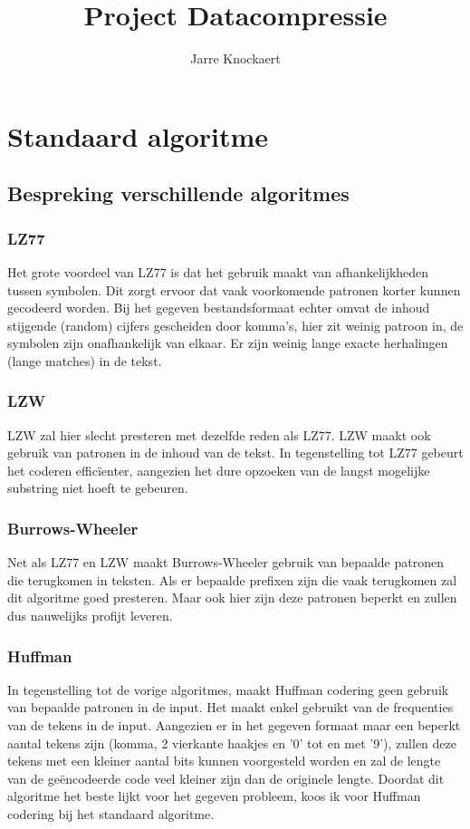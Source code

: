 \documentclass[11pt, a4paper]{article}
\begin{document}
	\title{Project Datacompressie}
	\author{Jarre Knockaert}
	\maketitle
\thispagestyle{empty}
\newpage
{}
\section{Standaard algoritme}
\subsection{Bespreking verschillende algoritmes}
\subsubsection{LZ77}
Het grote voordeel van LZ77 is dat het gebruik maakt van afhankelijkheden tussen symbolen. Dit zorgt ervoor dat vaak voorkomende patronen korter kunnen gecodeerd worden. Bij het gegeven bestandsformaat echter omvat de inhoud stijgende (random) cijfers gescheiden door komma's, hier zit weinig patroon in, de symbolen zijn onafhankelijk van elkaar. Er zijn weinig lange exacte herhalingen (lange matches) in de tekst. 

\subsubsection{LZW}
LZW zal hier slecht presteren met dezelfde reden als LZ77. LZW maakt ook gebruik van patronen in de inhoud van de tekst. In tegenstelling tot LZ77 gebeurt het coderen effic\"{i}enter, aangezien het dure opzoeken van de langst mogelijke substring niet hoeft te gebeuren. 

\subsubsection{Burrows-Wheeler}
Net als LZ77 en LZW maakt Burrows-Wheeler gebruik van bepaalde patronen die terugkomen in teksten. Als er bepaalde prefixen zijn die vaak terugkomen zal dit algoritme goed presteren. Maar ook hier zijn deze patronen beperkt en zullen dus nauwelijks profijt leveren. 

\subsubsection{Huffman}
In tegenstelling tot de vorige algoritmes, maakt Huffman codering geen gebruik van bepaalde patronen in de input. Het maakt enkel gebruikt van de frequenties van de tekens in de input. Aangezien er in het gegeven formaat maar een beperkt aantal tekens zijn (komma, 2 vierkante haakjes en '0' tot en met '9'), zullen deze tekens met een kleiner aantal bits kunnen voorgesteld worden en zal de lengte van de ge\"{e}ncodeerde code veel kleiner zijn dan de originele lengte. Doordat dit algoritme het beste lijkt voor het gegeven probleem, koos ik voor Huffman codering bij het standaard algoritme. 
\end{document}
